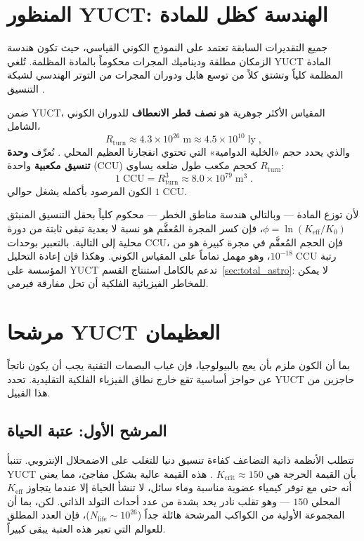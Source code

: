 \documentclass[11pt,a4paper]{article}
\newcommand{\Keff}{K_{\mathrm{eff}}}
\newcommand{\CCU}{\text{CCU}}  %
\begin{document}
	\section{المنظور YUCT: الهندسة كظل للمادة}
	\label{sec:yuct_geometry}
	جميع التقديرات السابقة تعتمد على النموذج الكوني القياسي، حيث تكون هندسة الزمكان مطلقة وديناميك المجرات محكوماً بالمادة المظلمة. تُلغي YUCT المادة المظلمة كلياً وتشتق كلاً من توسع هابل ودوران المجرات من التوتر الهندسي لشبكة التنسيق \citep{YUCT,AppGravity}.
	
	ضمن YUCT، المقياس الأكثر جوهرية هو \textbf{نصف قطر الانعطاف} للدوران الكوني الشامل،
	\begin{equation}
		R_{\mathrm{turn}} \approx 4.3\times 10^{26}\;\mathrm{m}
		\approx 4.5\times 10^{10}\;\mathrm{ly}\;,
	\end{equation}
	والذي يحدد حجم «الخلية الدوامية» التي تحتوي انفجارنا العظيم المحلي \citep{AppOmega}. نُعرِّف \textbf{وحدة تنسيق مكعبية} واحدة (CCU) كحجم مكعب طول ضلعه يساوي \(R_{\mathrm{turn}}\):
	\begin{equation}
		1\;\CCU = R_{\mathrm{turn}}^{3} \approx 8.0\times 10^{79}\;\mathrm{m}^{3}\; .
	\end{equation}
	الكون المرصود بأكمله يشغل حوالي \(1\;\CCU\).
	
	لأن توزع المادة — وبالتالي هندسة مناطق الخطر — محكوم كلياً بحقل التنسيق المنبثق \(\phi = \ln(\Keff/K_{0})\)، فإن كسر المجرة المُعقَّم هو نسبة لا بعدية تبقى ثابتة من دورة محلية إلى التالية. بالتعبير بوحدات CCU، فإن الحجم المُعقَّم في مجرة كبيرة هو من رتبة \(10^{-18}\;\CCU\)، وهو مهمل تماماً على المقياس الكوني. وهكذا فإن إعادة التحليل المؤسسة على YUCT تدعم بالكامل استنتاج القسم~\ref{sec:total_astro}: لا يمكن للمخاطر الفيزيائية الفلكية أن تحل مفارقة فيرمي.
	
	\section{مرشحا YUCT العظيمان}
	\label{sec:yuct_filters}
	بما أن الكون ملزم بأن يعج بالبيولوجيا، فإن غياب البصمات التقنية يجب أن يكون ناتجاً عن حواجز أساسية تقع خارج نطاق الفيزياء الفلكية التقليدية. تحدد YUCT حاجزين من هذا القبيل.
	
	\subsection{المرشح الأول: عتبة الحياة}
	\label{sec:filter1}
	تتطلب الأنظمة ذاتية التضاعف كفاءة تنسيق دنيا للتغلب على الاضمحلال الإنتروبي. تتنبأ YUCT بأن القيمة الحرجة هي \(K_{\mathrm{crit}}\approx 150\) \citep{AppT}. هذه القيمة عالية بشكل مفاجئ، مما يعني أنه حتى مع توفر كيمياء عضوية مناسبة وماء سائل، لا تنشأ الحياة إلا عندما يتجاوز \(K_{\mathrm{eff}}\) المحلي \(150\) — وهو تقلب نادر يحد بشدة من عدد أحداث التولد الذاتي. لكن، بما أن المجموعة الأولية من الكواكب المرشحة هائلة جداً (\(N_{\mathrm{life}}\sim 10^{26}\))، فإن العدد المطلق للعوالم التي تعبر هذه العتبة يبقى كبيراً.
	
\end{document}
